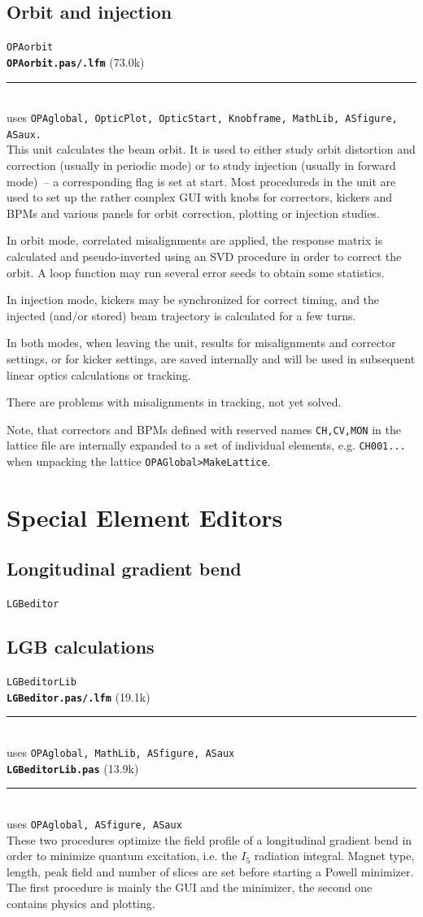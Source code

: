 \documentclass[12pt]{article}
\newcommand\code[1]{{\tt #1}}
\newcommand{\opagui}[1]{\colorbox{blue!20}{\code{#1}}}
\newcommand{\oguih}[2]{\subsection{\label{#2}#1}{\Huge\opagui{#2}}\\}
\newcommand{\opauni}[1]{\colorbox{orange!30}{\code{#1}}}
\newcommand{\ounih}[2]{\subsection{\label{#2}#1}{\Huge\opauni{#2}}\\}
\newcommand{\todo}[1]{{\color{red} #1}}
\newcommand\opamodule[3]{{\bf \tt #1} #2\\  \rule[3pt]{\textwidth}{0.2pt} \\ {\scriptsize uses \tt  #3}\\[1ex]}
\begin{document}
\oguih{Orbit and injection}{OPAorbit} 




\opamodule{OPAorbit.pas/.lfm}{(73.0k)}{OPAglobal, OpticPlot,  OpticStart, Knobframe, MathLib, ASfigure, ASaux.}
This unit calculates the beam orbit. It is used to either study orbit distortion and correction (usually in periodic mode) or to study injection (usually in forward mode)~-- a corresponding flag is set at start. Most procedureds in the unit are used to set up the rather complex GUI with knobs for correctors, kickers and BPMs and various panels for orbit correction, plotting or injection studies.

In orbit mode, correlated misalignments are applied, the response matrix is calculated and pseudo-inverted using an SVD procedure in order to correct the orbit. A loop function may run several error seeds to obtain some statistics.

In injection mode, kickers may be synchronized for correct timing, and the injected (and/or stored) beam trajectory is calculated for a few turns.

In both modes, when leaving the unit, results for misalignments and corrector settings, or for kicker settings, are saved internally and will be used in subsequent linear optics calculations or tracking.

\todo{There are problems with misalignments in tracking, not yet solved.}

Note, that correctors and BPMs defined with reserved names {\tt CH,CV,MON} in the lattice file are internally expanded to a set of individual elements, e.g. {\tt CH001...} when unpacking the lattice \code{OPAGlobal>MakeLattice}.





\section{\label{secspee}Special Element Editors}


\oguih{Longitudinal gradient bend}{LGBeditor} 




\ounih{LGB calculations}{LGBeditorLib} 



\opamodule{LGBeditor.pas/.lfm}{(19.1k)}{OPAglobal,  MathLib, ASfigure, ASaux}
\opamodule{LGBeditorLib.pas}{(13.9k)}{OPAglobal, ASfigure, ASaux}
These two procedures optimize the field profile of a longitudinal gradient bend in order to minimize quantum excitation, i.e. the $I_5$ radiation integral. Magnet type, length, peak field and number of slices are set before starting a Powell minimizer. The first procedure is mainly the GUI and the minimizer, the second one contains physics and plotting.
\end{document}
